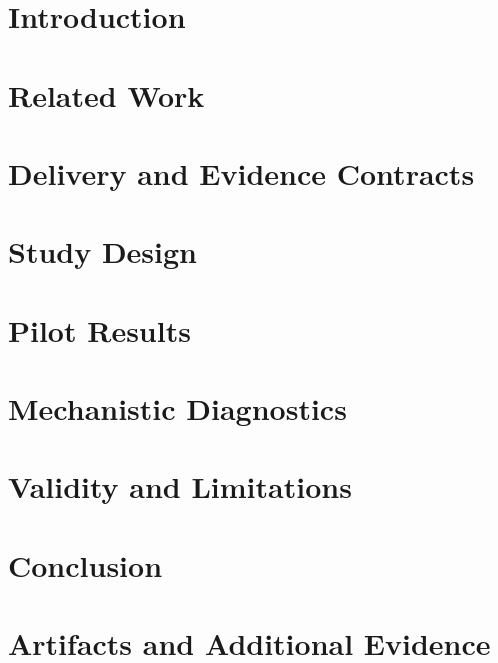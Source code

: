 \documentclass[10pt,letterpaper]{article}
\begin{document}
\section{Introduction}
\section{Related Work}
\section{Delivery and Evidence Contracts}
\section{Study Design}
\section{Pilot Results}
\section{Mechanistic Diagnostics}
\section{Validity and Limitations}
\section{Conclusion}


\appendix
\section{Artifacts and Additional Evidence}
\end{document}
